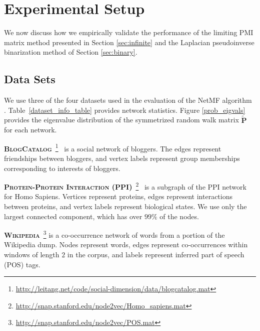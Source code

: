 \documentclass[sigconf]{acmart}
\newcommand{\mbf}[1]{\mathbf{#1}}
\begin{document}
\section{Experimental Setup}

We now discuss how we empirically validate the performance of the limiting PMI matrix method presented in Section \ref{sec:infinite} and the Laplacian pseudoinverse binarization method of Section \ref{sec:binary}.

\subsection{Data Sets}

We use three of the four datasets used in the evaluation of the NetMF algorithm \cite{qiu2018network}. Table~\ref{dataset_info_table} provides network statistics. Figure \ref{prob_eigvals} provides the eigenvalue distribution of the symmetrized random walk matrix $\mbf{\tilde{P}}$ for each network.

\textbf{\textsc{BlogCatalog}}~\footnote{\url{http://leitang.net/code/social-dimension/data/blogcatalog.mat}}~\cite{agarwal2009social} is a social network of bloggers. The edges represent friendships between bloggers, and vertex labels represent group memberships corresponding to interests of bloggers.

\textbf{\textsc{Protein-Protein Interaction (PPI)}}~\footnote{\url{http://snap.stanford.edu/node2vec/Homo_sapiens.mat}}~\cite{stark2010biogrid} is a subgraph of the \textsc{PPI} network for Homo Sapiens. Vertices represent proteins, edges represent interactions between proteins, and vertex labels represent biological states. We use only the largest connected component, which has over $99\%$ of the nodes.

\textbf{\textsc{Wikipedia}}~\footnote{\url{http://snap.stanford.edu/node2vec/POS.mat}} is a co-occurrence network of words from a portion of the Wikipedia dump. Nodes represent words, edges represent co-occurrences within windows of length $2$ in the corpus, and labels represent inferred part of speech (POS) tags.

\end{document}
